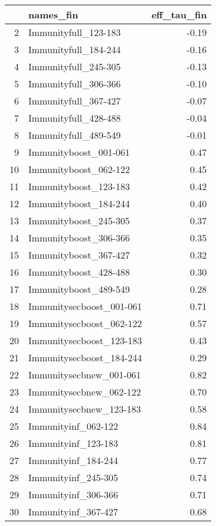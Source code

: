 \begin{table}[ht]
\centering
\begin{tabular}{rlr}
  \hline
 & names\_fin & eff\_tau\_fin \\ 
  \hline
2 & Immunityfull\_123-183 & -0.19 \\ 
  3 & Immunityfull\_184-244 & -0.16 \\ 
  4 & Immunityfull\_245-305 & -0.13 \\ 
  5 & Immunityfull\_306-366 & -0.10 \\ 
  6 & Immunityfull\_367-427 & -0.07 \\ 
  7 & Immunityfull\_428-488 & -0.04 \\ 
  8 & Immunityfull\_489-549 & -0.01 \\ 
  9 & Immunityboost\_001-061 & 0.47 \\ 
  10 & Immunityboost\_062-122 & 0.45 \\ 
  11 & Immunityboost\_123-183 & 0.42 \\ 
  12 & Immunityboost\_184-244 & 0.40 \\ 
  13 & Immunityboost\_245-305 & 0.37 \\ 
  14 & Immunityboost\_306-366 & 0.35 \\ 
  15 & Immunityboost\_367-427 & 0.32 \\ 
  16 & Immunityboost\_428-488 & 0.30 \\ 
  17 & Immunityboost\_489-549 & 0.28 \\ 
  18 & Immunitysecboost\_001-061 & 0.71 \\ 
  19 & Immunitysecboost\_062-122 & 0.57 \\ 
  20 & Immunitysecboost\_123-183 & 0.43 \\ 
  21 & Immunitysecboost\_184-244 & 0.29 \\ 
  22 & Immunitysecbnew\_001-061 & 0.82 \\ 
  23 & Immunitysecbnew\_062-122 & 0.70 \\ 
  24 & Immunitysecbnew\_123-183 & 0.58 \\ 
  25 & Immunityinf\_062-122 & 0.84 \\ 
  26 & Immunityinf\_123-183 & 0.81 \\ 
  27 & Immunityinf\_184-244 & 0.77 \\ 
  28 & Immunityinf\_245-305 & 0.74 \\ 
  29 & Immunityinf\_306-366 & 0.71 \\ 
  30 & Immunityinf\_367-427 & 0.68 \\ 

\end{tabular}
\end{table}
